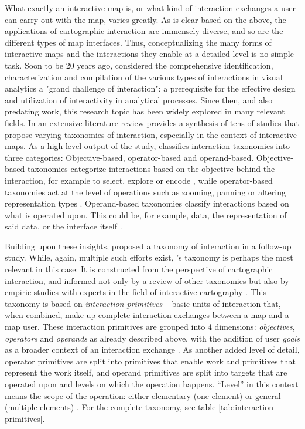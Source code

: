 What exactly an interactive map is,
or what kind of interaction exchanges a user can carry out with the map,
varies greatly.  %
As is clear based on the above,
the applications of cartographic interaction are immensely diverse,
and so are the different types of map interfaces.
Thus, conceptualizing the many forms of
interactive maps and the interactions they enable
at a detailed level is no simple task.
Soon to be 20 years ago,
\textcite{tho2005} considered the comprehensive
identification, characterization and compilation
of the various types of interactions in visual analytics a
"grand challenge of interaction":
a prerequisite for the effective design and utilization of
interactivity in analytical processes.
Since then, and also predating  work,
this research topic has been widely explored in many relevant fields.
In an extensive literature review \textcite{rot2012}
provides a synthesis of tens of studies
that propose varying taxonomies of interaction,
especially in the context of interactive maps.
As a high-level output of the study, \citeauthor{rot2012}
classifies interaction taxonomies into three categories:
Objective-based, operator-based and operand-based.
Objective-based taxonomies categorize interactions based on
the objective behind the interaction,
for example to select, explore or encode \parencite{yi2007},
while operator-based taxonomies act at the level of operations such as
zooming, panning or altering representation types \parencite{eds2008}.
Operand-based taxonomies classify interactions based on what is operated upon.
This could be, for example, data, the representation of said data,
or the interface itself \parencite{cra2002}.

Building upon these insights,
\textcite{rot2013a} proposed a taxonomy of interaction in a follow-up study.
While, again, multiple such efforts exist,
\citeauthor{rot2013a}'s taxonomy is perhaps the most relevant in this case:
It is constructed from the perspective of cartographic interaction,
and informed not only by a review of other taxonomies \parencite{rot2012}
but also by empiric studies with experts in the field of interactive cartography
\parencite{rot2013a}.
This taxonomy is based on \textit{interaction primitives} --
basic units of interaction that, when combined,
make up complete interaction exchanges between a map and a map user.
These interaction primitives are grouped into 4 dimensions:
\textit{objectives}, \textit{operators} and \textit{operands} as already described above,
with the addition of user \textit{goals} as a broader context of
an interaction exchange \parencite{rot2013a}.
As another added level of detail, operator primitives are split into primitives that
enable work and primitives that represent the work itself,
and operand primitives are split into targets that are operated
upon and levels on which the operation happens.
\enquote{Level} in this context means the scope of the operation:
either elementary (one element) or general (multiple elements) \parencite{rot2013a}.
For the complete taxonomy, see table \ref{tab:interaction primitives}.

